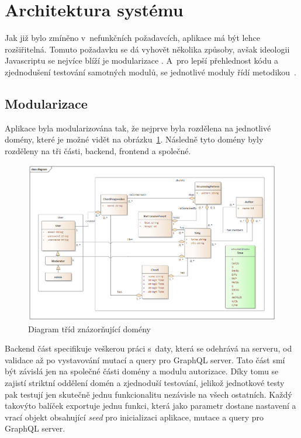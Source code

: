 \section{Architektura systému}
\label{sc:system_architecture}
Jak již bylo zmíněno v~nefunkčních požadavcích, aplikace má být lehce rozšiřitelná. Tomuto požadavku se dá vyhovět několika způsoby, avšak ideologii Javascriptu se nejvíce blíží je modularizace \cite{bevacqua_2018_mastering}. A~pro lepší přehlednost kódu a zjednodušení testování samotných modulů, se jednotlivé moduly řídí metodikou~.

\subsection{Modularizace}
Aplikace byla modularizována tak, že nejprve byla rozdělena na jednotlivé domény, které je možné vidět na obrázku~\ref{fig:class_diagram}. Následně tyto domény byly rozděleny na tři části, backend, frontend a společné.

\begin{figure}
    \centering
    \includegraphics[width=\textwidth]{assets/class_diagram.png}
    \caption{Diagram tříd znázorňující domény}
    \label{fig:class_diagram}
\end{figure}

Backend část specifikuje veškerou práci s~daty, která se odehrává na serveru, od validace až po vystavování mutací a query pro GraphQL server. Tato část smí být závislá jen na společné části domény a modulu autorizace. Díky tomu se zajistí striktní oddělení domén a zjednoduší testování, jelikož jednotkové testy pak testují jen skutečně jednu funkcionalitu nezávisle na všech ostatních. Každý takovýto balíček exportuje jednu funkci, která jako parametr dostane nastavení a vrací objekt obsahující \emph{seed} pro inicializaci aplikace, mutace a query pro GraphQL server.

